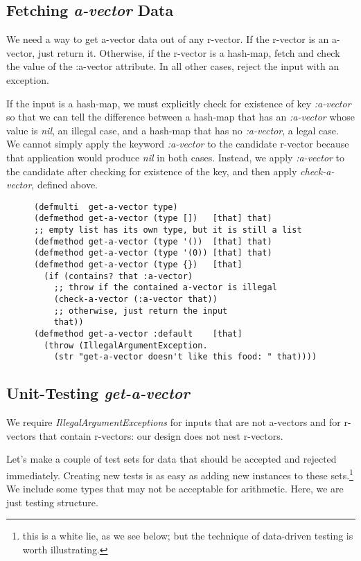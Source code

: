 \documentclass[11pt]{article}
\begin{document}
\subsection{Fetching \emph{a-vector} Data}
\label{sec-4-3}

We need a way to get a-vector data out of any r-vector. If the
r-vector is an a-vector, just return it. Otherwise, if the r-vector
is a hash-map, fetch and check the value of the \mbox{:a-vector}
attribute. In all other cases, reject the input with an exception.

If the input is a hash-map, we must explicitly check for existence of
key \emph{\mbox{:a-vector}} so that we can tell the difference between a
hash-map that has an \emph{\mbox{:a-vector}} whose value is \emph{nil}, an
illegal case, and a hash-map that has no \emph{\mbox{:a-vector}}, a legal
case. We cannot simply apply the keyword \emph{\mbox{:a-vector}} to the
candidate r-vector because that application would produce \emph{nil} in
both cases. Instead, we apply \emph{\mbox{:a-vector}} to the candidate
after checking for existence of the key, and then apply
\emph{check-a-vector}, defined above.

\begin{figure}[H]
\label{get-a-vector-helper}
\begin{verbatim}
(defmulti  get-a-vector type)
(defmethod get-a-vector (type [])   [that] that)
;; empty list has its own type, but it is still a list
(defmethod get-a-vector (type '())  [that] that)
(defmethod get-a-vector (type '(0)) [that] that)
(defmethod get-a-vector (type {})   [that]
  (if (contains? that :a-vector)
    ;; throw if the contained a-vector is illegal
    (check-a-vector (:a-vector that))
    ;; otherwise, just return the input
    that))
(defmethod get-a-vector :default    [that]
  (throw (IllegalArgumentException.
    (str "get-a-vector doesn't like this food: " that))))
\end{verbatim}
\end{figure}
\subsection{Unit-Testing \emph{get-a-vector}}
\label{sec-4-4}

We require \emph{IllegalArgumentExceptions} for inputs that are not
a-vectors and for r-vectors that contain r-vectors: our design does
not nest r-vectors.

Let's make a couple of test sets for data that should be accepted and
rejected immediately. Creating new tests is as easy as adding new
instances to these sets.\footnote{this is a white lie, as we see below;
   but the technique of data-driven testing is worth illustrating.} We
include some types that may not be acceptable for arithmetic. Here,
we are just testing structure.
\end{document}
